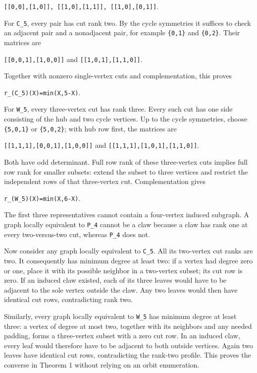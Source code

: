 \documentclass[
  11pt,
]{article}
\begin{document}
\texttt{{[}{[}0,0{]},{[}1,0{]}{]},\ {[}{[}1,0{]},{[}1,1{]}{]},\ {[}{[}1,0{]},{[}0,1{]}{]}}.

For \texttt{C\_5}, every pair has cut rank two. By the cycle symmetries
it suffices to check an adjacent pair and a nonadjacent pair, for
example \texttt{\{0,1\}} and \texttt{\{0,2\}}. Their matrices are

\texttt{{[}{[}0,0,1{]},{[}1,0,0{]}{]}} and
\texttt{{[}{[}1,0,1{]},{[}1,1,0{]}{]}}.

Together with nonzero single-vertex cuts and complementation, this
proves

\texttt{r\_(C\_5)(X)=min(\textbar{}X\textbar{},5-\textbar{}X\textbar{})}.

For \texttt{W\_5}, every three-vertex cut has rank three. Every such cut
has one side consisting of the hub and two cycle vertices. Up to the
cycle symmetries, choose \texttt{\{5,0,1\}} or \texttt{\{5,0,2\}}; with
hub row first, the matrices are

\texttt{{[}{[}1,1,1{]},{[}0,0,1{]},{[}1,0,0{]}{]}} and
\texttt{{[}{[}1,1,1{]},{[}1,0,1{]},{[}1,1,0{]}{]}}.

Both have odd determinant. Full row rank of these three-vertex cuts
implies full row rank for smaller subsets: extend the subset to three
vertices and restrict the independent rows of that three-vertex cut.
Complementation gives

\texttt{r\_(W\_5)(X)=min(\textbar{}X\textbar{},6-\textbar{}X\textbar{})}.

The first three representatives cannot contain a four-vertex induced
subgraph. A graph locally equivalent to \texttt{P\_4} cannot be a claw
because a claw has rank one at every two-versus-two cut, whereas
\texttt{P\_4} does not.

Now consider any graph locally equivalent to \texttt{C\_5}. All its
two-vertex cut ranks are two. It consequently has minimum degree at
least two: if a vertex had degree zero or one, place it with its
possible neighbor in a two-vertex subset; its cut row is zero. If an
induced claw existed, each of its three leaves would have to be adjacent
to the sole vertex outside the claw. Any two leaves would then have
identical cut rows, contradicting rank two.

Similarly, every graph locally equivalent to \texttt{W\_5} has minimum
degree at least three: a vertex of degree at most two, together with its
neighbors and any needed padding, forms a three-vertex subset with a
zero cut row. In an induced claw, every leaf would therefore have to be
adjacent to both outside vertices. Again two leaves have identical cut
rows, contradicting the rank-two profile. This proves the converse in
Theorem 1 without relying on an orbit enumeration.
\end{document}
